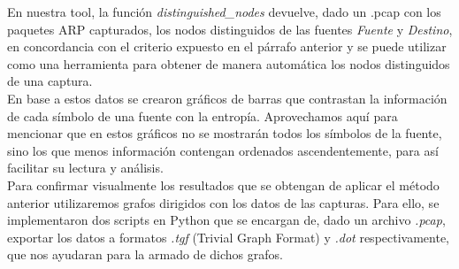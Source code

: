 \indent En nuestra tool, la función \textit{distinguished\_nodes} devuelve, dado un .pcap con los paquetes ARP capturados, los nodos distinguidos de las fuentes \textit{Fuente} y \textit{Destino}, en concordancia con el criterio expuesto en el párrafo anterior y se puede utilizar como una herramienta para obtener de manera automática los nodos distinguidos de una captura.\\
\indent En base a estos datos se crearon gráficos de barras que contrastan la información de cada símbolo de una fuente con la entropía. Aprovechamos aquí para mencionar que en estos gráficos no se mostrarán todos los símbolos de la fuente, sino los que menos información contengan ordenados ascendentemente, para así facilitar su lectura y análisis.\\
\indent Para confirmar visualmente los resultados que se obtengan de aplicar el método anterior utilizaremos grafos dirigidos con los datos de las capturas. Para ello, se implementaron dos scripts en Python que se encargan de, dado un archivo \textit{.pcap}, exportar los datos a formatos \textit{.tgf} (Trivial Graph Format) y \textit{.dot} respectivamente, que nos ayudaran para la armado de dichos grafos.\\
